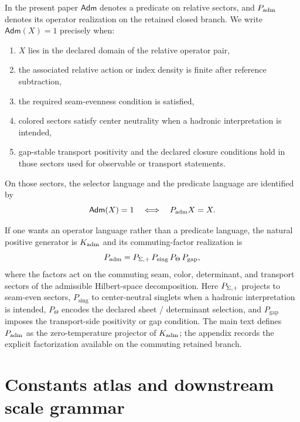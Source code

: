 \begin{definition}
In the present paper $\mathsf{Adm}$ denotes a predicate on relative sectors, and $P_{\mathrm{adm}}$ denotes its operator realization on the retained closed branch. We write $\mathsf{Adm}(X)=1$ precisely when:
\begin{enumerate}[label=(\arabic*), leftmargin=1.5em, topsep=3pt, itemsep=2pt]
    \item $X$ lies in the declared domain of the relative operator pair,
    \item the associated relative action or index density is finite after reference subtraction,
    \item the required seam-evenness condition is satisfied,
    \item colored sectors satisfy center neutrality when a hadronic interpretation is intended,
    \item gap-stable transport positivity and the declared closure conditions hold in those sectors used for observable or transport statements.
\end{enumerate}
On those sectors, the selector language and the predicate language are identified by
\[
\mathsf{Adm}(X)=1
\quad\Longleftrightarrow\quad
P_{\mathrm{adm}} X=X.
\]
\end{definition}

\begin{remark}
If one wants an operator language rather than a predicate language, the natural positive generator is $K_{\mathrm{adm}}$ and its commuting-factor realization is
\[
P_{\mathrm{adm}}=P_{\Sigma,+}\,P_{\mathrm{sing}}\,P_{\Theta}\,P_{\mathrm{gap}},
\]
where the factors act on the commuting seam, color, determinant, and transport sectors of the admissible Hilbert-space decomposition. Here $P_{\Sigma,+}$ projects to seam-even sectors, $P_{\mathrm{sing}}$ to center-neutral singlets when a hadronic interpretation is intended, $P_{\Theta}$ encodes the declared sheet / determinant selection, and $P_{\mathrm{gap}}$ imposes the transport-side positivity or gap condition. The main text defines $P_{\mathrm{adm}}$ as the zero-temperature projector of $K_{\mathrm{adm}}$; the appendix records the explicit factorization available on the commuting retained branch.
\end{remark}

\section{Constants atlas and downstream scale grammar}
\label{app:constants}

